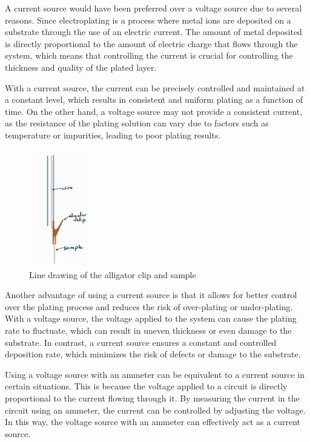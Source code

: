 A current source would have been preferred over a voltage source due to several reasons. Since electroplating is a process where metal ions are deposited on a substrate through the use of an electric current. The amount of metal deposited is directly proportional to the amount of electric charge that flows through the system, which means that controlling the current is crucial for controlling the thickness and quality of the plated layer.

With a current source, the current can be precisely controlled and maintained at a constant level, which results in consistent and uniform plating as a function of time. On the other hand, a voltage source may not provide a consistent current, as the resistance of the plating solution can vary due to factors such as temperature or impurities, leading to poor plating results.


\begin{figure}
    \centering
    \includegraphics[width=0.25\textwidth]{Main/Ch1/Current Sample holder.png}
    \caption{Line drawing of the alligator clip and sample }
\end{figure}

Another advantage of using a current source is that it allows for better control over the plating process and reduces the risk of over-plating or under-plating. With a voltage source, the voltage applied to the system can cause the plating rate to fluctuate, which can result in uneven thickness or even damage to the substrate. In contrast, a current source ensures a constant and controlled deposition rate, which minimizes the risk of defects or damage to the substrate.

Using a voltage source with an ammeter can be equivalent to a current source in certain situations. This is because the voltage applied to a circuit is directly proportional to the current flowing through it. By measuring the current in the circuit using an ammeter, the current can be controlled by adjusting the voltage. In this way, the voltage source with an ammeter can effectively act as a current source.


